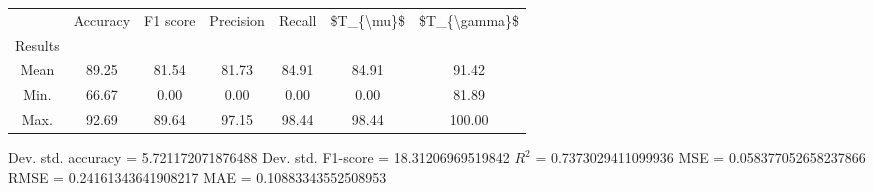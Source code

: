 \begin{tabular}{|c|c|c|c|c|c|c|}
\toprule
{} &  Accuracy &  F1 score &  Precision &  Recall &  \$T\_\{\textbackslash mu\}\$ &  \$T\_\{\textbackslash gamma\}\$ \\
Results &           &           &            &         &            &               \\
\hline
Mean    &     89.25 &     81.54 &      81.73 &   84.91 &      84.91 &         91.42 \\
Min.    &     66.67 &      0.00 &       0.00 &    0.00 &       0.00 &         81.89 \\
Max.    &     92.69 &     89.64 &      97.15 &   98.44 &      98.44 &        100.00 \\
\bottomrule
\end{tabular}

 Dev. std. accuracy = 5.721172071876488
 Dev. std. F1-score = 18.31206969519842
 $R^2$ = 0.7373029411099936
 MSE = 0.058377052658237866
 RMSE = 0.24161343641908217
 MAE = 0.10883343552508953